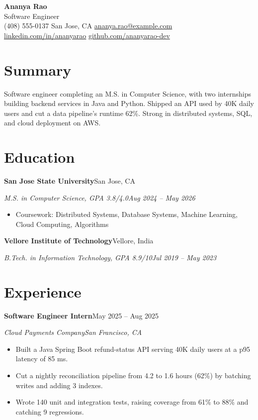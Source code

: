 \documentclass[letterpaper,11pt]{article}
\makeatletter
\newcommand{\csep}{\hspace{5pt}\textbar\hspace{5pt}}
\newcommand{\rRole}[4]{%
  \vspace{2pt}%
  \noindent\textbf{#1}\hfill#4\par
  \noindent\textit{#2}\hfill\textit{#3}\par
  \vspace{1pt}%
}
\newcommand{\rEdu}[4]{%
  \vspace{2pt}%
  \noindent\textbf{#2}\hfill#3\par
  \noindent\textit{#1}\hfill\textit{#4}\par
  \vspace{1pt}%
}
\newenvironment{rBullets}
  {\begin{itemize}[leftmargin=14pt,itemsep=0.5pt,parsep=0pt,topsep=2pt,
                   partopsep=0pt,label=\textbullet]}
  {\end{itemize}}
\def\name{Ananya Rao}
\def\role{Software Engineer}
\def\phone{(408) 555-0137}
\def\location{San Jose, CA}
\def\email{ananya.rao@example.com}
\def\LinkedIn{ananyarao}
\def\github{ananyarao-dev}
\makeatother
\begin{document}
\begin{center}
  {\huge\bfseries\name}\\[3pt]
  {\large\role}\\[4pt]
  {\small
    \phone\csep
    \location\csep
    \href{mailto:\email}{\email}\csep
    \href{https://linkedin.com/in/\LinkedIn}{linkedin.com/in/\LinkedIn}\csep
    \href{https://github.com/\github}{github.com/\github}}
\end{center}

\section{Summary}
Software engineer completing an M.S. in Computer Science, with two internships
building backend services in Java and Python. Shipped an API used by 40K daily
users and cut a data pipeline's runtime 62\%. Strong in distributed systems,
SQL, and cloud deployment on AWS.

\section{Education}
\rEdu{M.S. in Computer Science, GPA 3.8/4.0}{San Jose State University}{San Jose, CA}{Aug 2024 -- May 2026}
\begin{rBullets}
  \item Coursework: Distributed Systems, Database Systems, Machine Learning, Cloud Computing, Algorithms
\end{rBullets}
\rEdu{B.Tech. in Information Technology, GPA 8.9/10}{Vellore Institute of Technology}{Vellore, India}{Jul 2019 -- May 2023}

\section{Experience}

\rRole{Software Engineer Intern}{Cloud Payments Company}{San Francisco, CA}{May 2025 -- Aug 2025}
\begin{rBullets}
  \item Built a Java Spring Boot refund-status API serving 40K daily users at a p95 latency of 85 ms.
  \item Cut a nightly reconciliation pipeline from 4.2 to 1.6 hours (62\%) by batching writes and adding 3 indexes.
  \item Wrote 140 unit and integration tests, raising coverage from 61\% to 88\% and catching 9 regressions.
\end{rBullets}
\end{document}
